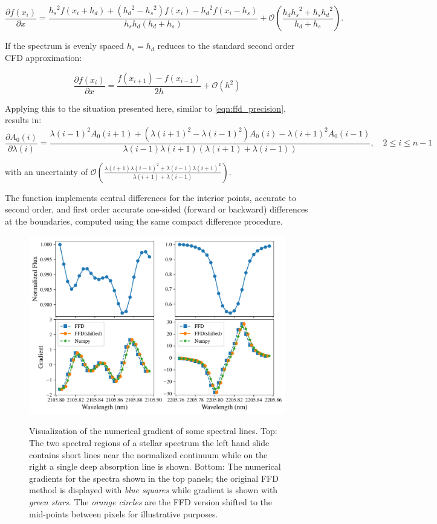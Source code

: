 \[\frac{\partial{f(x_i)}}{\partial{x}} = \frac{{h_{s}}^{2}f\left(x_{i} + {h_{d}}\right) + \left({h_{d}}^{2} - {h_{s}}^{2}\right)f\left(x_{i}\right) - {h_{d}}^{2}f\left(x_{i}-{h_{s}}\right)} {{h_{s}}{h_{d}}\left({h_{d}} + {h_{s}}\right)} + \mathcal{O}\left(\frac{h_{d}{h_{s}}^{2} + {h_{s}}{h_{d}}^{2}}{{h_{d}} + {h_{s}}}\right) \label{full_compact_difference}.\]

If the spectrum is evenly spaced ${h_{s}}={h_{d}}$  reduces to the standard second order {CFD} approximation:

\[\frac{\partial{f(x_i)}}{\partial{x}} = \frac{f\left(x_{i+1}\right) - f\left(x_{i-1}\right)}{2h} + \mathcal{O}\left({h}^{2}\right)\]

Applying this to the situation presented here, similar to \cref{eqn:ffd_precision}, results in:
\[\frac{\partial {A}_{0}(i)}{\partial\lambda(i)} = \frac{{\lambda(i-1)}^{2} {A}_{0}(i+1) + ({\lambda(i+1)}^{2}-{\lambda(i-1)}^{2}) {A}_{0}(i) - {\lambda(i+1)}^{2} {A}_{0}(i-1)} {\lambda(i-1)\lambda(i+1)(\lambda(i+1) + \lambda(i-1))}, \hspace{1em} 2 \leq i \leq n-1\]

with an uncertainty of \(\mathcal{O}\left(\frac{\lambda(i+1){\lambda(i-1)}^{2} + \lambda(i-1){\lambda(i+1)}^{2}}{\lambda(i+1) + \lambda(i-1)}\right)\).

The \npgradient{} function implements central differences for the interior points, accurate to second order, and first order accurate one-sided (forward or backward) differences at the boundaries, computed using the same compact difference procedure.

\begin{figure}
    \centering
    \includegraphics[width=0.85\linewidth]{figures/information-content/spectral_gradients}\\
    \caption[Comparing of numerical gradient alogithms.]{Visualization of the numerical gradient of some spectral lines.
        Top: The two spectral regions of a stellar spectrum the left hand slide contains short lines near the normalized continuum while on the right a single deep absorption line is shown.
        Bottom: The numerical gradients for the spectra shown in the top panels; the original {FFD} method is displayed with \emph{blue squares} while \numpy{} gradient is shown with \emph{green stars}.
        The \emph{orange circles} are the {FFD} version shifted to the mid-points between pixels for illustrative purposes.}
    \label{fig:gradients}
\end{figure}


